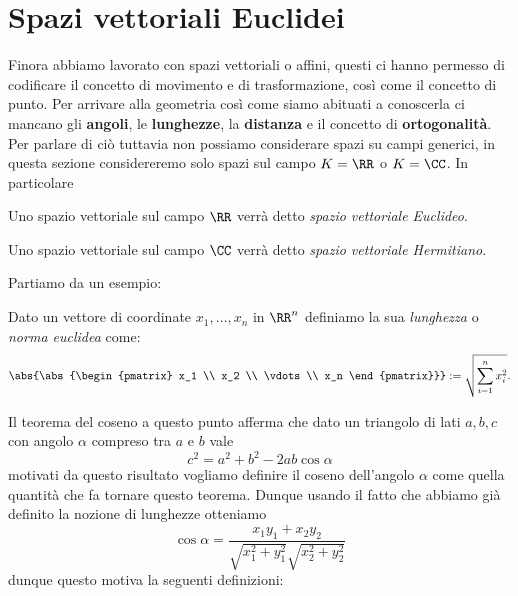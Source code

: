 \documentclass[11pt]{scrartcl}
\begin{document}
   	 \newpage
   	 
   	 \section{Spazi vettoriali Euclidei}
   	 
   	 Finora abbiamo lavorato con spazi vettoriali o affini, questi ci hanno permesso di codificare il concetto di movimento e di trasformazione, così come il concetto di punto. Per arrivare alla geometria così come siamo abituati a conoscerla ci mancano gli \textbf{angoli}, le \textbf{lunghezze}, la \textbf{distanza} e il concetto di \textbf{ortogonalità}. \\
   	 Per parlare di ciò tuttavia non possiamo considerare spazi su campi generici, in questa sezione considereremo solo spazi sul campo $K=\RR$ o $K=\CC$. In particolare
   	 \begin{definition}
   	 	Uno spazio vettoriale sul campo $\RR$ verrà detto \textit{spazio vettoriale Euclideo}.
   	 \end{definition}
   	 \begin{definition}
   	 	Uno spazio vettoriale sul campo $\CC$ verrà detto \textit{spazio vettoriale Hermitiano}.
   	 \end{definition}
   	 Partiamo da un esempio:
   	 \begin{definition}
   	 	Dato un vettore di coordinate $x_1,\dots,x_n$ in $\RR^n$ definiamo la sua \textit{lunghezza} o \textit{norma euclidea} come:
   	 	$$\abs{\abs{\begin{pmatrix}
   	 				x_1 \\
   	 				x_2 \\
   	 				\vdots \\
   	 				x_n
   	 	\end{pmatrix}}}:=\sqrt{\sum_{i=1}^n x_i^2}.$$
   	 \end{definition}
   	 Il teorema del coseno a questo punto afferma che dato un triangolo di lati $a,b,c$ con angolo $\alpha$ compreso tra $a$ e $b$ vale
   	 $$c^2=a^2+b^2-2ab\cos \alpha$$
   	 motivati da questo risultato vogliamo definire il coseno dell'angolo $\alpha $ come quella quantità che fa tornare questo teorema. Dunque usando il fatto che abbiamo già definito la nozione di lunghezze otteniamo
   	 $$\cos \alpha=\frac{x_1y_1+x_2y_2}{\sqrt{x_1^2+y_1^2}\sqrt{x_2^2+y_2^2}}$$
   	 dunque questo motiva la seguenti definizioni:
\end{document}
